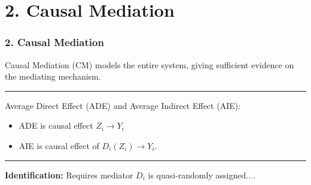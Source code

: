 \documentclass[dvipsnames]{beamer} %
\newcommand{\E}[2][]{\mathbb{E}_{#1} \left[ #2 \right]}                    %
\newcommand{\eqhighlight}[2]{\colorbox{#1!50}{$\displaystyle#2$}}
\begin{document}
\section{2. Causal Mediation}
\begin{frame}
    \frametitle{2. Causal Mediation}
    Causal Mediation (CM) models the entire system, giving sufficient evidence on the mediating mechanism.
    \vskip-0.5cm
    \begin{figure}
        \centering
        \singlespacing
    \end{figure}
    
    \vskip0.75cm
    \par\noindent\rule{\textwidth}{0.4pt}
    \textcolor{gray!25}{
    Average Direct Effect (ADE) and Average Indirect Effect (AIE):}
    \begin{itemize}
        \item \textcolor{gray!25}{ADE is causal effect $Z_i \to Y_i$}
        \item \textcolor{gray!25}{AIE is causal effect of $D_i(Z_i) \to Y_i$.}
    \end{itemize}
    \pause
    \par\noindent\rule{\textwidth}{0.4pt}
    \textcolor{gray!25}{
    \textbf{Identification:} Requires mediator $D_i$ is quasi-randomly assigned$\hdots$.}
\end{frame}
\end{document}
